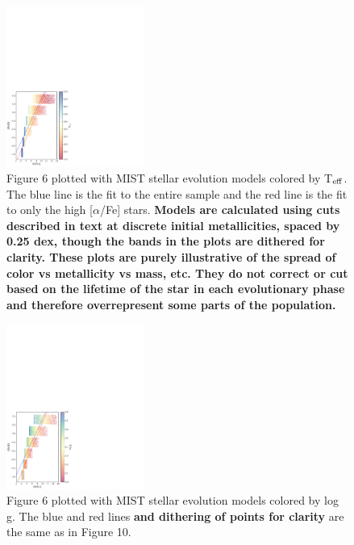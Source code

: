 \documentclass[twocolumn]{emulateapj}
\begin{document}
\begin{figure}[] %
\centering
\includegraphics[width=0.4\textwidth]{f10.pdf}
\caption{Figure 6 plotted with MIST stellar evolution models colored by T$_{\rm{eff}}$. The blue line is the fit to the entire sample and the red line is the fit to only the high [$\alpha$/Fe] stars. {\bf Models are calculated using cuts described in text at discrete initial metallicities, spaced by 0.25 dex, though the bands in the plots are dithered for clarity. These plots are purely illustrative of the spread of color vs metallicity vs mass, etc. They do not correct or cut based on the lifetime of the star in each evolutionary phase and therefore overrepresent some parts of the population.}}
\end{figure}

\begin{figure}[] %
\centering
\includegraphics[width=0.4\textwidth]{f11.pdf}
\caption{Figure 6 plotted with MIST stellar evolution models colored by log g. The blue and red lines {\bf and dithering of points for clarity} are the same as in Figure 10.}
\end{figure}
\end{document}
